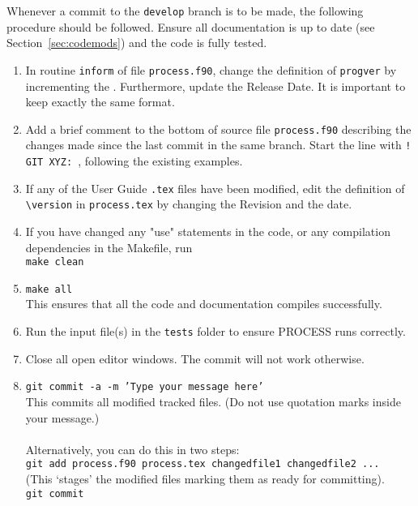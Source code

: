 \documentclass[11pt,a4paper]{report}
\newcommand{\version}{
15 March 2019
\hfill
PROCESS version: 1.0.15
}
\begin{document}
Whenever a commit to the \texttt{develop} branch is to be made, the following
procedure should be followed. Ensure all documentation is up to date (see
Section~\ref{sec:codemods}) and the code is fully tested.
\begin{enumerate}

\item In routine \texttt{inform} of file \texttt{process.f90}, change the
  definition of \texttt{progver} by incrementing the . Furthermore, update the Release Date. It is important to keep exactly the same format.

\item Add a brief comment to the bottom of source file \texttt{process.f90}
  describing the changes made since the last commit in the same branch. Start
  the line with \texttt{! GIT XYZ: }, following the existing examples.

\item If any of the User Guide \texttt{.tex} files have been modified, edit
  the definition of \verb+\version+ in \texttt{process.tex} by changing the
  Revision  and the date.

\item If you have changed any "use" statements in the code, or any compilation dependencies in the Makefile, run \\
\texttt{make clean}

\item \texttt{make all} \\
This ensures that all the code and documentation compiles successfully.

\item Run the input file(s) in the \texttt{tests} folder to ensure PROCESS runs correctly.

\item
Close all open editor windows.  The commit will not work otherwise.

\item   \texttt{git commit -a -m 'Type your message here'} \\
  This commits all modified tracked files. (Do not use quotation marks inside your message.)\\
  \\
  Alternatively, you can do this in two steps:\\
  \texttt{git add process.f90 process.tex changedfile1 changedfile2 ...}  \\
  (This `stages' the modified files marking them as ready for committing).  \\
  \texttt{git commit}


\end{enumerate}
\end{document}

